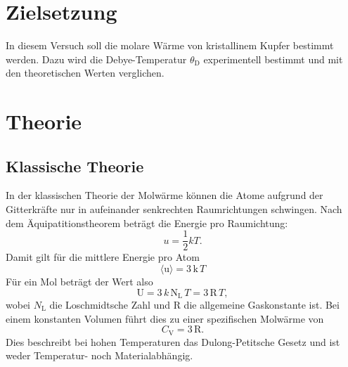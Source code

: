 \section{Zielsetzung}
\label{sec:Zielsetzung}
In diesem Versuch soll die molare Wärme von kristallinem Kupfer bestimmt werden.
Dazu wird die Debye-Temperatur $\theta_\text{D}$ experimentell bestimmt und mit den theoretischen
Werten verglichen.

\section{Theorie}
\label{sec:Theorie}

\subsection{Klassische Theorie}
\label{sec:Klassische Theorie}
In der klassischen Theorie der Molwärme können die Atome aufgrund der Gitterkräfte nur
in aufeinander senkrechten Raumrichtungen schwingen. Nach dem Äquipatitionstheorem beträgt
die Energie pro Raumichtung:
\begin{equation}
  u = \frac{1}{2} k T.
\end{equation}
Damit gilt für die mittlere Energie pro Atom
\begin{equation}
  \langle \text{u} \rangle = 3\,\text{k}\,T
\end{equation}
Für ein Mol beträgt der Wert also
\begin{equation}
  \text{U} = 3\, k\, \text{N}_\text{L}\, T = 3\,\text{R}\,T,
\end{equation}
wobei $N_\text{L}$ die Loschmidtsche Zahl und $\text{R}$ die allgemeine Gaskonstante ist.
Bei einem konstanten Volumen führt dies zu einer spezifischen Molwärme von
\begin{equation}
  C_\text{V} = 3\,\text{R}.
\end{equation}
Dies beschreibt bei hohen Temperaturen das Dulong-Petitsche Gesetz und ist weder
Temperatur- noch Materialabhängig.

